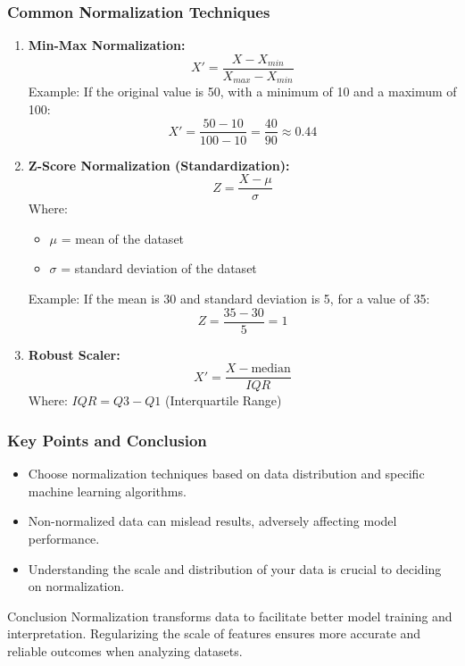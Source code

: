\documentclass[aspectratio=169]{beamer}
\begin{document}
\begin{frame}[fragile]
    \frametitle{Common Normalization Techniques}
    \begin{enumerate}
        \item \textbf{Min-Max Normalization:}
        \begin{equation}
            X' = \frac{X - X_{min}}{X_{max} - X_{min}}
        \end{equation}
        Example: 
        If the original value is 50, with a minimum of 10 and a maximum of 100:
        \begin{equation}
            X' = \frac{50 - 10}{100 - 10} = \frac{40}{90} \approx 0.44
        \end{equation}
        
        \item \textbf{Z-Score Normalization (Standardization):}
        \begin{equation}
            Z = \frac{X - \mu}{\sigma}
        \end{equation}
        Where: 
        \begin{itemize}
            \item \( \mu \) = mean of the dataset
            \item \( \sigma \) = standard deviation of the dataset
        \end{itemize}
        Example: If the mean is 30 and standard deviation is 5, for a value of 35:
        \begin{equation}
            Z = \frac{35 - 30}{5} = 1
        \end{equation}
        
        \item \textbf{Robust Scaler:}
        \begin{equation}
            X' = \frac{X - \text{median}}{IQR}
        \end{equation}
        Where: \( IQR = Q3 - Q1 \) (Interquartile Range)
    \end{enumerate}
\end{frame}

\begin{frame}[fragile]
    \frametitle{Key Points and Conclusion}
    \begin{itemize}
        \item Choose normalization techniques based on data distribution and specific machine learning algorithms.
        \item Non-normalized data can mislead results, adversely affecting model performance.
        \item Understanding the scale and distribution of your data is crucial to deciding on normalization.
    \end{itemize}
    \begin{block}{Conclusion}
        Normalization transforms data to facilitate better model training and interpretation. Regularizing the scale of features ensures more accurate and reliable outcomes when analyzing datasets.
    \end{block}
\end{frame}
\end{document}
